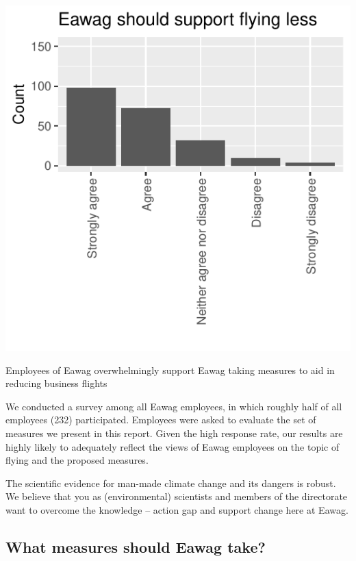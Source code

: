 \documentclass[]{tufte-handout}
\begin{document}
\begin{marginfigure}
\includegraphics{final_report_files/figure-latex/fig-margin-1} \caption[Employees of Eawag overwhelmingly support Eawag taking measures to aid in reducing business flights]{Employees of Eawag overwhelmingly support Eawag taking measures to aid in reducing business flights}\label{fig:fig-margin}
\end{marginfigure}

We conducted a survey among all Eawag employees, in which roughly half
of all employees (232) participated. Employees were asked to evaluate
the set of measures we present in this report. Given the high response
rate, our results are highly likely to adequately reflect the views of
Eawag employees on the topic of flying and the proposed measures.

The scientific evidence for man-made climate change and its dangers is
robust. We believe that you as (environmental) scientists and members of
the directorate want to overcome the knowledge -- action gap and support
change here at Eawag.

\hypertarget{what-measures-should-eawag-take}{%
\subsection{What measures should Eawag
take?}\label{what-measures-should-eawag-take}}
\end{document}
